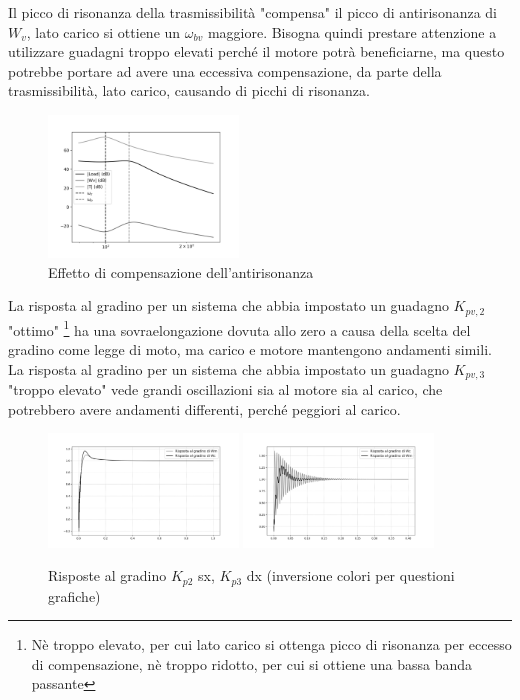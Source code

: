 Il picco di risonanza della trasmissibilità "compensa" il picco di antirisonanza di \(W_v\), lato carico si ottiene un \(\omega_{bv}\) maggiore.
Bisogna quindi prestare attenzione a utilizzare guadagni troppo elevati perché il motore potrà beneficiarne, ma questo potrebbe portare ad avere una eccessiva compensazione, da parte della trasmissibilità, lato carico, causando di picchi di risonanza.

\begin{figure}[h]
    \centering
    \includegraphics[width=0.45\textwidth]{Immagini/colocato_v_lato_carico.png}
    \caption{Effetto di compensazione dell'antirisonanza}
\end{figure}

La risposta al gradino per un sistema che abbia impostato un guadagno \(K_{pv,2}\) "ottimo" \footnote{Nè troppo elevato, per cui lato carico si ottenga picco di risonanza per eccesso di compensazione, nè troppo ridotto, per cui si ottiene una bassa banda passante} ha una sovraelongazione dovuta allo zero a causa della scelta del gradino come legge di moto, ma carico e motore mantengono andamenti simili.
La risposta al gradino per un sistema che abbia impostato un guadagno \(K_{pv,3}\) "troppo elevato" vede grandi oscillazioni sia al motore sia al carico, che potrebbero avere andamenti differenti, perché peggiori al carico.

\begin{figure}[h]
    \centering
    \includegraphics[width=0.45\textwidth]{Immagini/step_response_Kp2.png}
    \includegraphics[width=0.45\textwidth]{Immagini/step_response_Kp3.png}
    \caption{Risposte al gradino \(K_{p2}\) sx, \(K_{p3}\) dx (inversione colori per questioni grafiche)}
\end{figure}

